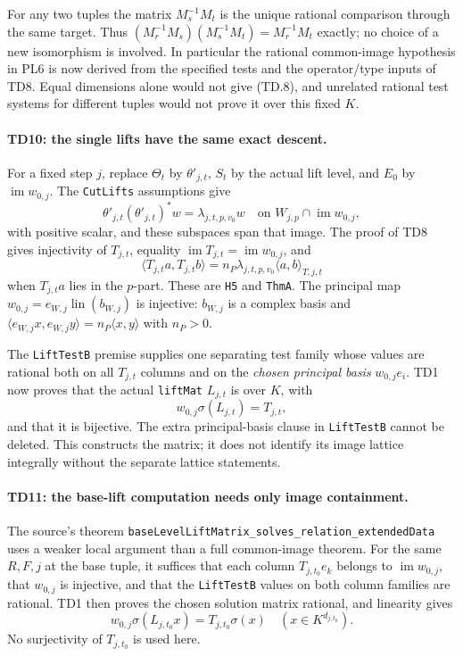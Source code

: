 For any two tuples the matrix $M_s^{-1}M_t$ is the unique rational
comparison through the same target. Thus
$(M_r^{-1}M_s)(M_s^{-1}M_t)=M_r^{-1}M_t$ exactly; no choice of a new
isomorphism is involved. In particular the rational common-image
hypothesis in PL6 is now derived from the specified tests and the
operator/type inputs of TD8. Equal dimensions alone would not give
(TD.8), and unrelated rational test systems for different tuples
would not prove it over this fixed $K$.

\paragraph{TD10: the single lifts have the same exact descent.}
For a fixed step $j$, replace $\Theta_t$ by $\theta'_{j,t}$,
$S_t$ by the actual lift level, and $E_0$ by
$\operatorname{im}w_{0,j}$. The \texttt{CutLifts} assumptions give
\[
 \theta'_{j,t}(\theta'_{j,t})^*w=\lambda_{j,t,p,v_0}w
 \quad\text{on }W_{j,p}\cap\operatorname{im}w_{0,j},
\]
with positive scalar, and these subspaces span that image. The proof of
TD8 gives injectivity of $T_{j,t}$, equality
$\operatorname{im}T_{j,t}=\operatorname{im}w_{0,j}$, and
\[
 \langle T_{j,t}a,T_{j,t}b\rangle
   =n_P\lambda_{j,t,p,v_0}\langle a,b\rangle_{T,j,t}
\]
when $T_{j,t}a$ lies in the $p$-part. These are \texttt{H5} and
\texttt{ThmA}. The principal map $w_{0,j}=e_{W,j}\operatorname{lin}(b_{W,j})$
is injective: $b_{W,j}$ is a complex basis and
$\langle e_{W,j}x,e_{W,j}y\rangle=n_P\langle x,y\rangle$ with $n_P>0$.

The \texttt{LiftTestB} premise supplies one separating test family
whose values are rational both on all $T_{j,t}$ columns and on the
\emph{chosen principal basis} $w_{0,j}e_i$. TD1 now proves that the
actual \texttt{liftMat} $L_{j,t}$ is over $K$, with
\[
 w_{0,j}\sigma(L_{j,t})=T_{j,t},
\]
and that it is bijective. The extra principal-basis clause in
\texttt{LiftTestB} cannot be deleted. This constructs the matrix; it
does not identify its image lattice integrally without the separate
lattice statements.

\paragraph{TD11: the base-lift computation needs only image containment.}
The source's theorem
\texttt{baseLevelLiftMatrix\_solves\_relation\_extendedData}
uses a weaker local argument than a full common-image theorem. For the
same $R,F,j$ at the base tuple, it suffices that each column
$T_{j,t_0}e_k$ belongs to $\operatorname{im}w_{0,j}$, that $w_{0,j}$
is injective, and that the \texttt{LiftTestB} values on both column
families are rational. TD1 then proves the chosen solution matrix
rational, and linearity gives
\[
 w_{0,j}\sigma(L_{j,t_0}x)=T_{j,t_0}\sigma(x)
 \quad(x\in K^{d_{j,t_0}}). \tag{TD.9}
\]
No surjectivity of $T_{j,t_0}$ is used here.

